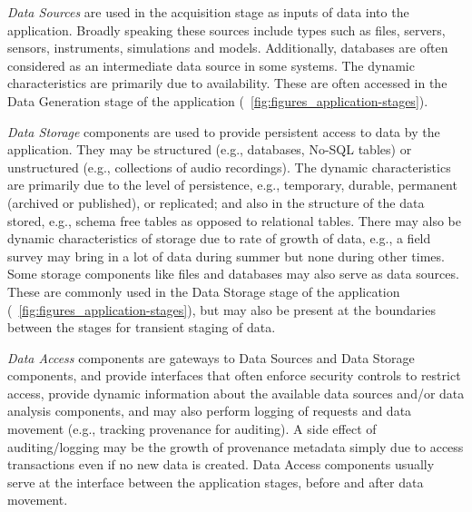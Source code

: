 
{\em Data Sources} are used in the acquisition stage as inputs of data
into the application. Broadly speaking these sources include types such as
files, servers, sensors, instruments, simulations and models.
Additionally, databases are often considered as an intermediate data
source in some systems. The dynamic characteristics are primarily
due to availability. These are often accessed in the Data Generation stage of the application
(\figurename~\ref{fig:figures_application-stages}).

{\em Data Storage} components are used to provide persistent access to
data by the application. They may be structured (e.g., databases,
No-SQL tables) or unstructured (e.g., collections of audio
recordings). The dynamic characteristics are primarily due to the
level of persistence, e.g., temporary, durable, permanent (archived or
published), or replicated; and also in the structure of the data
stored, e.g., schema free tables as opposed to relational tables. There
may also be dynamic characteristics of storage due to rate of growth
of data, e.g., a field survey may bring in a lot of data during summer
but none during other times. Some storage components like files and databases may also serve as data
sources. These are commonly used in the Data Storage stage of the application (\figurename~\ref{fig:figures_application-stages}),
but may also be present at the boundaries between the stages for transient staging of data.

{\em Data Access} components are gateways to Data Sources and Data
Storage components, and provide interfaces that often enforce security
controls to restrict access, provide dynamic information about the
available data sources and/or data analysis components, and may also
perform logging of requests and data movement (e.g., tracking
provenance for auditing). A side effect of auditing/logging may be the
growth of provenance metadata simply due to access transactions even
if no new data is created. Data Access components usually serve at the interface between the application stages, before
and after data movement.

